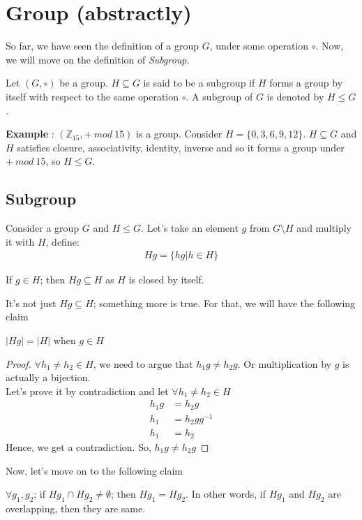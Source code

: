 \section{Group (abstractly)}
So far, we have seen the definition of a group $G$, under some operation $\circ$. Now, we will move on the definition of \emph{Subgroup}.
\begin{definition}
Let $(G,\circ) $ be a group. $H\subseteq G$ is said to be a subgroup if $H$ forms a group by itself with respect to the same operation $\circ$. A subgroup of $G$ is denoted by $H\leq G$. 
\end{definition}
\textbf{Example} : $(\mathbb{Z}_{15},+ \ mod \ 15) $ is a group. Consider $H=\{0,3,6,9,12\}$. $H\subseteq G$ and $H$ satisfies closure, associativity, identity, inverse and so it forms a group under $+ \ mod \ 15 $, so $H\leq G$.
\subsection{Subgroup}
Consider a group $G$ and $H\leq G$. Let's take an element $g$ from $G\setminus H$ and multiply it with $H$, define:
\begin{align}
Hg=\{hg|h\in H\}
\end{align} 
\begin{observation}
If $g\in H$; then $Hg\subseteq H$ as $H$ is closed by itself. 
\end{observation}
It's not just $Hg\subseteq H$; something more is true. For that, we will have the following claim
\begin{claim}
$|Hg|=|H|$ when $g\in H$
\end{claim}
\begin{proof}
$\forall h_1\neq h_2\in H$, we need to argue that $h_1g\neq h_2g$. Or multiplication by $g$ is actually a bijection.\\
Let's prove it by contradiction and let $\forall h_1\neq h_2\in H$
\begin{align*}
h_1g&=h_2g\\
h_1&=h_2gg^{-1}\\
h_1&=h_2
\end{align*}
Hence, we get a contradiction. So, $h_1g\neq h_2g$
\end{proof}
Now, let's move on to the following claim
\begin{claim}
$\forall g_1,g_2$; if $Hg_1\cap Hg_2\neq \emptyset $; then $Hg_1=Hg_2$. In other words, if $Hg_1$ and $Hg_2$ are overlapping, then they are same.
\end{claim}
